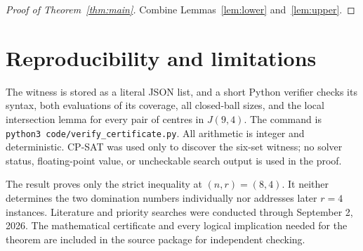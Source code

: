 \documentclass[11pt]{amsart}
\begin{document}
\begin{proof}[Proof of Theorem~\ref{thm:main}]
Combine Lemmas~\ref{lem:lower} and~\ref{lem:upper}.
\end{proof}

\section{Reproducibility and limitations}
The witness is stored as a literal JSON list, and a short Python verifier
checks its syntax, both evaluations of its coverage, all closed-ball sizes,
and the local intersection lemma for every pair of centres in $J(9,4)$.  The
command is \texttt{python3 code/verify\_certificate.py}.  All arithmetic is
integer and deterministic.  CP-SAT was used only to discover the six-set
witness; no solver status, floating-point value, or uncheckable search output
is used in the proof.

The result proves only the strict inequality at $(n,r)=(8,4)$.  It neither
determines the two domination numbers individually nor addresses later
$r=4$ instances.  Literature and priority searches were conducted through
September 2, 2026.  The mathematical certificate and every logical
implication needed for the theorem are included in the source package for
independent checking.



\end{document}
